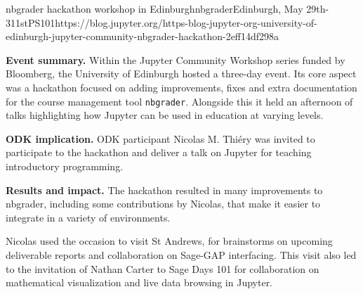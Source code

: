 \begin{event}{nbgrader hackathon workshop in Edinburgh}{nbgrader}{Edinburgh, May
    29th-311st}{PS}{10}{1}{https://blog.jupyter.org/https-blog-jupyter-org-university-of-edinburgh-jupyter-community-nbgrader-hackathon-2eff14df298a}

  \textbf{Event summary.} Within the Jupyter Community Workshop series
  funded by Bloomberg, the University of Edinburgh hosted a three-day
  event. Its core aspect was a hackathon focused on adding
  improvements, fixes and extra documentation for the course
  management tool \texttt{nbgrader}. Alongside this it held an
  afternoon of talks highlighting how Jupyter can be used in education
  at varying levels.

  \textbf{ODK implication.} ODK participant Nicolas M. Thiéry was
  invited to participate to the hackathon and deliver a talk on
  Jupyter for teaching introductory programming.

  \textbf{Results and impact.} The hackathon resulted in many
  improvements to nbgrader, including some contributions by Nicolas,
  that make it easier to integrate in a variety of environments.

  Nicolas used the occasion to visit St Andrews, for brainstorms on
  upcoming deliverable reports and collaboration on Sage-GAP
  interfacing. This visit also led to the invitation of Nathan Carter
  to Sage Days 101 for collaboration on mathematical visualization and
  live data browsing in Jupyter.
\end{event}
